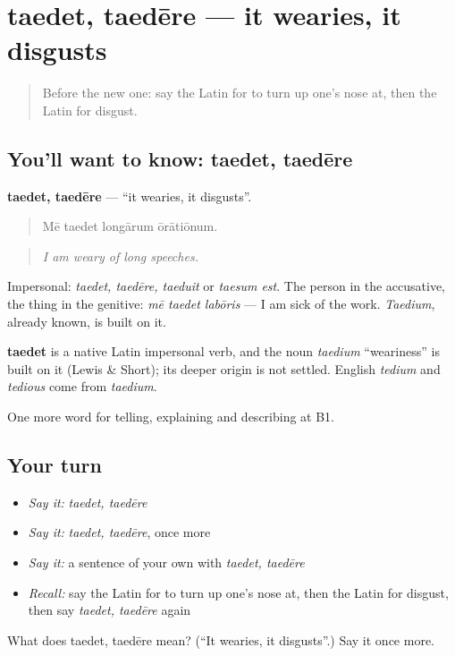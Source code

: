 \section[taedet, taedēre]{taedet, taedēre — it wearies, it disgusts}

\label{lesson:LA-C494-taedet}



\begin{quote}
Before the new one: say the Latin for to turn up one's nose at, then the Latin for disgust.
\end{quote}

\subsection*{You'll want to know: taedet, taedēre}
\textbf{taedet, taedēre} — \textquotedblleft{}it wearies, it disgusts\textquotedblright{}.

\begin{quote}
Mē taedet longārum ōrātiōnum.
\end{quote}

\begin{quote}
\emph{I am weary of long speeches.}
\end{quote}

Impersonal: \emph{taedet, taedēre, taeduit} or \emph{taesum est}. The person in the accusative, the thing in the genitive: \emph{mē taedet labōris} — I am sick of the work. \emph{Taedium}, already known, is built on it.

\begin{cousinweb}
\textbf{taedet} is a native Latin impersonal verb, and the noun \emph{taedium} \textquotedblleft{}weariness\textquotedblright{} is built on it (Lewis \& Short); its deeper origin is not settled. English \emph{tedium} and \emph{tedious} come from \emph{taedium}.
\end{cousinweb}

\begin{grammarlens}[title={What you've built}]
One more word for telling, explaining and describing at B1.
\end{grammarlens}

\subsection*{Your turn}
\begin{itemize}
\raggedright
  \item \emph{Say it:} \emph{taedet, taedēre}
  \item \emph{Say it:} \emph{taedet, taedēre}, once more
  \item \emph{Say it:} a sentence of your own with \emph{taedet, taedēre}
  \item \emph{Recall:} say the Latin for to turn up one's nose at, then the Latin for disgust, then say \emph{taedet, taedēre} again
\end{itemize}

\begin{tcolorbox}[breakable,colback=teal!4,colframe=teal!35!black,title={Before you move on}]
What does taedet, taedēre mean? (\textquotedblleft{}It wearies, it disgusts\textquotedblright{}.) Say it once more.
\end{tcolorbox}
